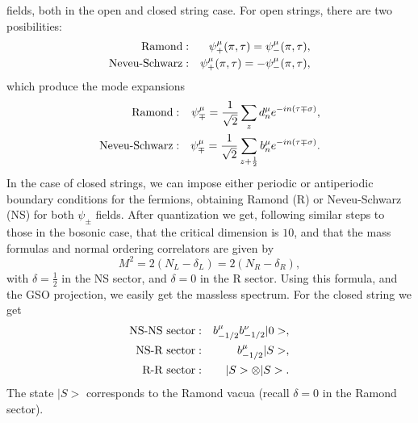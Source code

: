 fields, both in the open and closed string case. For open
strings, there are two posibilities:
\begin{eqnarray}
\hbox {Ramond} & : & \psi_+^{\mu} (\pi,\tau) = \psi_-^{\mu}(\pi,
\tau), \nonumber \\
\hbox {Neveu-Schwarz} & : & \psi_+^{\mu} (\pi,\tau) = - \psi_-^{\mu}(\pi,
\tau),
\label{eq:III54}
\end{eqnarray}
which produce the mode expansions 
\begin{eqnarray}
\hbox {Ramond} & : & \psi_{\mp}^{\mu} = \frac {1}{\sqrt{2}}
\sum_z d_n^{\mu} e^{-in(\tau \mp \sigma)},  \nonumber \\
\hbox {Neveu-Schwarz} & : & \psi_{\mp}^{\mu} = \frac
{1}{\sqrt{2}} \sum_{z+\frac {1}{2}} b_n^{\mu} e^{-in(\tau \mp
\sigma)}.
\label{eq:III55}
\end{eqnarray}
In the case of closed strings, we can impose either periodic or
antiperiodic boundary conditions for the fermions, obtaining
Ramond (R) or Neveu-Schwarz (NS) for both $\psi_{\pm}$ fields.
After quantization we get, following similar steps to those in
the bosonic case, that the critical dimension is $10$, and that
the mass formulas and normal ordering correlators are given by 
\begin{equation}
M^2 = 2 (N_L - \delta_L) = 2 (N_R - \delta_R),
\label{eq:III56}
\end{equation}
with $\delta= \frac {1}{2}$ in the NS sector, and $\delta=0$ in
the R sector. Using this formula, and the GSO projection, we
easily get the massless spectrum. For the closed string we get 
\begin{eqnarray}
\hbox {NS-NS sector} & : & b_{-1/2}^{\mu} b_{-1/2}^{\nu} |0>, \nonumber \\
\hbox {NS-R sector}  & : & b_{-1/2}^{\mu} |S>, \nonumber \\
\hbox {R-R sector}  & : &  |S> \otimes |S> .
\label{eq:spectrum}
\end{eqnarray}
The state $|S>$ corresponds to the Ramond vacua (recall
$\delta=0$ in the Ramond sector). 
  
